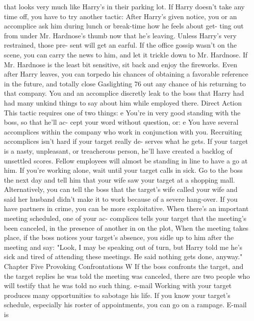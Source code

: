 \documentclass{book}
\begin{document}
that looks very much like Harry's in their parking lot. 
If Harry doesn't take any time off, you have to try another 
tactic: 
After Harry's given notice, you or an accomplice ask 
him during lunch or break-time how he feels about get- 
ting out from under Mr. Hardnose's thumb now that 
he’s leaving. Unless Harry's very restrained, those pre- 
sent will get an earful. If the office gossip wasn't on the 
scene, you can carry the news to him, and let it trickle 
down to Mr. Hardnose. If Mr. Hardnose is the least bit 
sensitive, sit back and enjoy the fireworks. 
Even after Harry leaves, you can torpedo his chances of 
obtaining a favorable reference in the future, and totally close  Gaslighting 
76 
out any chance of his returning to that company. You and an 
accomplice discretly leak to the boss that Harry had had many 
unkind things to say about him while employed there. 
Direct Action 
This tactic requires one of two things: 
e You're in very good standing with the boss, so that he'll ac- 
cept your word without question, or: 
e You have several accomplices within the company who 
work in conjunction with you. 
Recruiting accomplices isn't hard if your target really de- 
serves what he gets. If your target is a nasty, unpleasant, or 
treacherous person, he'll have created a backlog of unsettled 
scores. Fellow employees will almost be standing in line to have 
a go at him. 
If you're working alone, wait until your target calls in sick. 
Go to the boss the next day and tell him that your wife saw your 
target at a shopping mall. 
Alternatively, you can tell the boss that the target's wife 
called your wife and said her husband didn't make it to work 
because of a severe hang-over. 
If you have partners in crime, you can be more exploitative. 
When there's an important meeting scheduled, one of your ac- 
complices tells your target that the meeting's been canceled, in 
the presence of another in on the plot, When the meeting takes 
place, if the boss notices your target's absence, you sidle up to 
him after the meeting and say: 
"Look, I may be speaking out of turn, but Harry told me he's 
sick and tired of attending these meetings. He said nothing gets 
done, anyway." 
Chapter Five 
Provoking Confrontations 
W 
If the boss confronts the target, and the target replies he was 
told the meeting was canceled, there are two people who will 
testify that he was told no such thing. 
e-mail 
Working with your target produces many opportunities to 
sabotage his life. If you know your target's schedule, especially 
his roster of appointments, you can go on a rampage. E-mail is 
\end{document}
